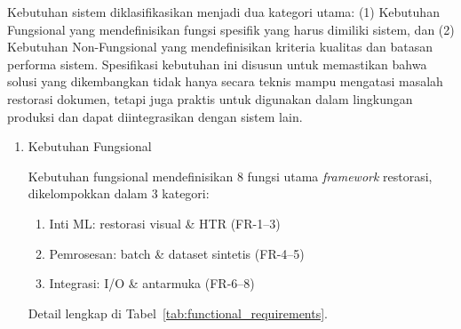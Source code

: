 Kebutuhan sistem diklasifikasikan menjadi dua kategori utama: (1) Kebutuhan Fungsional yang mendefinisikan fungsi spesifik yang harus dimiliki sistem, dan (2) Kebutuhan Non-Fungsional yang mendefinisikan kriteria kualitas dan batasan performa sistem. Spesifikasi kebutuhan ini disusun untuk memastikan bahwa solusi yang dikembangkan tidak hanya secara teknis mampu mengatasi masalah restorasi dokumen, tetapi juga praktis untuk digunakan dalam lingkungan produksi dan dapat diintegrasikan dengan sistem lain.
\begin{enumerate}[label=\arabic*., leftmargin=*]

\item Kebutuhan Fungsional

Kebutuhan fungsional mendefinisikan 8 fungsi utama \textit{framework} restorasi, dikelompokkan dalam 3 kategori:

\begin{enumerate}[label=(\alph*), nosep]
    \item Inti ML: restorasi visual \& HTR (FR-1--3)
    \item Pemrosesan: batch \& dataset sintetis (FR-4--5)
    \item Integrasi: I/O \& antarmuka (FR-6--8)
\end{enumerate}

Detail lengkap di Tabel~\ref{tab:functional_requirements}.


\end{enumerate}
